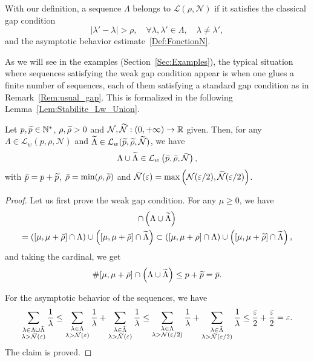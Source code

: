 \documentclass[AHL,Unicode,longabstracts]{cedram}
\newcommand{\LL}{\mathcal{L}}
\newcommand{\NN}{\mathcal{N}}
\newcommand{\N}{\mathbb{N}}
\newcommand{\R}{\mathbb{R}}
\let\oldtilde\tilde
\renewcommand*{\tilde}[1]{\mathchoice{\widetilde{#1}}{\widetilde{#1}}{\oldtilde{#1}}{\oldtilde{#1}}}\let\oldexists\exists
\renewcommand*{\exists}{\mathrel{\oldexists}}
\let\oldforall\forall
\renewcommand*{\forall}{\mathrel{\oldforall}}
\begin{document}
\begin{rema}\label{Rem:usual_gap}
With our definition, a sequence $\Lambda$ belongs to $\LL(\rho,\NN)$ if it satisfies the classical gap condition
\begin{equation}\label{FattoriniRussell_Gap}
|\lambda' - \lambda| > \rho, \quad \forall \lambda,\lambda'\in \Lambda, \quad \lambda\neq \lambda',
\end{equation}
and the asymptotic behavior estimate~\eqref{Def:FonctionN}.
\end{rema}

As we will see in the examples (Section~\ref{Sec:Examples}), the typical situation where sequences satisfying the weak gap condition appear is when one glues a finite number of sequences, each of them satisfying a standard gap condition as in Remark~\ref{Rem:usual_gap}. This is formalized in the following Lemma~\ref{Lem:Stabilite_Lw_Union}.


\begin{lemm}\label{Lem:Stabilite_Lw_Union}
Let $p,\tilde{p} \in \N^*$, $\rho,\tilde{\rho} > 0$ and $\NN,\tilde{\NN} : (0,+\infty) \to \R$ given. Then, for any $\Lambda\in \LL_w(p, \rho, \NN)$ and $\tilde{\Lambda}\in \LL_w(\tilde{p}, \tilde{\rho}, \tilde{\NN})$, we have
\[
\Lambda \cup \tilde{\Lambda} \in \LL_w\left(\bar{p}, \bar{\rho}, \bar{\NN}\right),
\]
with $\bar{p}=p+\tilde{p}$, $\bar{\rho}=\min(\rho,\tilde{\rho})$ and $\bar{\NN}(\varepsilon) = \max \left(\NN(\varepsilon/2),\tilde{\NN}(\varepsilon/2)\right)$.
\end{lemm}

\begin{proof}
Let us first prove the weak gap condition. For any $\mu\geq 0$, we have
\begin{multline*}
[\mu,\mu+\bar{\rho}] \cap \left(\Lambda\cup \tilde{\Lambda}\right)\\ = \left([\mu,\mu+\bar{\rho}] \cap \Lambda \right) \cup \left([\mu,\mu+\bar{\rho}]\cap \tilde{\Lambda}\right)
\subset \left([\mu,\mu+\rho] \cap \Lambda \right) \cup \left([\mu,\mu+\tilde{\rho}]\cap \tilde{\Lambda}\right),
\end{multline*}
and taking the cardinal, we get
\[
\# [\mu,\mu+\bar{\rho}] \cap \left(\Lambda\cup \tilde{\Lambda}\right) \leq p + \tilde{p}=\bar{p}.
\]

For the asymptotic behavior of the sequences, we have
\[
\sum_{\substack{\lambda \in \Lambda\cup \tilde{\Lambda} \\ \lambda>\bar{\NN}(\varepsilon)}} \frac{1}{\lambda}
\leq \sum_{\substack{\lambda \in \Lambda \\ \lambda>\bar{\NN}(\varepsilon)}} \frac{1}{\lambda} + \sum_{\substack{\lambda \in \tilde{\Lambda} \\ \lambda>\bar{\NN}(\varepsilon)}} \frac{1}{\lambda}
\leq \sum_{\substack{\lambda \in \Lambda \\ \lambda>{\NN}(\varepsilon/2)}} \frac{1}{\lambda} + \sum_{\substack{\lambda \in \tilde{\Lambda} \\ \lambda>\tilde{\NN}(\varepsilon/2)}} \frac{1}{\lambda}
\leq \frac{\varepsilon}{2} + \frac{\varepsilon}{2} = \varepsilon.
\]
The claim is proved.
\end{proof}
\end{document}
